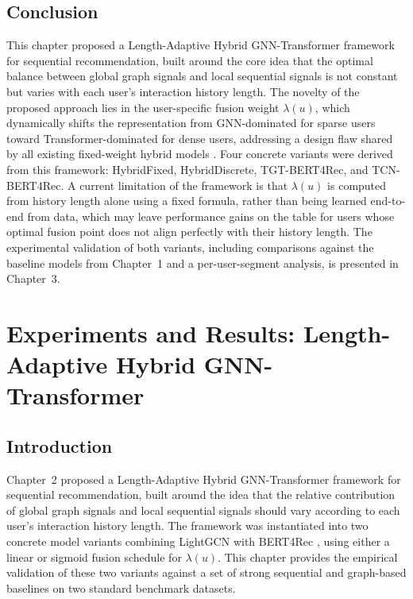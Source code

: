 \documentclass[12pt,a4paper]{report}
\begin{document}
\section{Conclusion}
\label{sec:ch2conclusion}

\justifying
This chapter proposed a Length-Adaptive Hybrid GNN-Transformer framework for
sequential recommendation, built around the core idea that the optimal balance
between global graph signals and local sequential signals is not constant but
varies with each user's interaction history length. The novelty of the proposed
approach lies in the user-specific fusion weight \(\lambda(u)\), which
dynamically shifts the representation from GNN-dominated for sparse users
toward Transformer-dominated for dense users, addressing a design flaw shared
by all existing fixed-weight hybrid models \citep{wu2020gnnsurvey,
pan2024survey}. Four concrete variants were derived from this framework: \mbox{HybridFixed}, HybridDiscrete, TGT-BERT4Rec, and TCN-BERT4Rec.
A current limitation of the framework is that \(\lambda(u)\) is computed from
history length alone using a fixed formula, rather than being learned
end-to-end from data, which may leave performance gains on the table for users
whose optimal fusion point does not align perfectly with their history length.
The experimental validation of both variants, including comparisons against the
baseline models from Chapter~1 and a per-user-segment analysis, is presented
in Chapter~3.

\chapter{Experiments and Results: Length-Adaptive Hybrid GNN-Transformer}


\section{Introduction}

\justifying
Chapter~2 proposed a Length-Adaptive Hybrid GNN-Transformer framework for
sequential recommendation, built around the idea that the relative contribution
of global graph signals and local sequential signals should vary according to
each user's interaction history length. The framework was instantiated into two
concrete model variants combining LightGCN \citep{he2020lightgcn} with
BERT4Rec \citep{sun2019bert4rec}, using either a linear or sigmoid fusion
schedule for \(\lambda(u)\). This chapter provides the empirical validation of
these two variants against a set of strong sequential and graph-based baselines
on two standard benchmark datasets.
\end{document}
